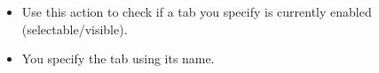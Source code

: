 \begin{itemize}
\item Use this action to check if a tab you specify is currently enabled (selectable/visible).
\item You specify the tab using its name. 
\end{itemize}
